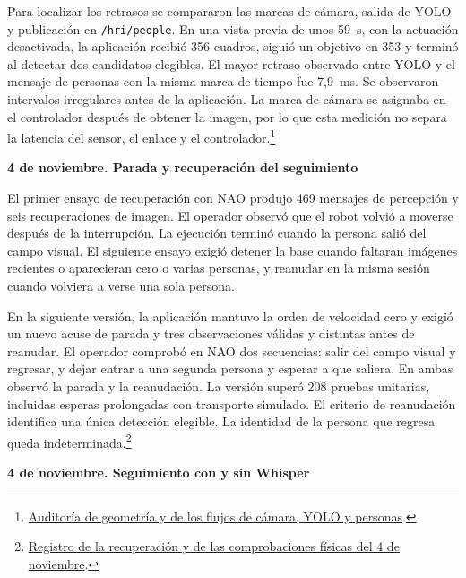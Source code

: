 \documentclass[11pt,letterpaper]{article}
\newcommand{\code}[1]{\nolinkurl{#1}}
\begin{document}
Para localizar los retrasos se compararon las marcas de cámara, salida de YOLO y publicación en \code{/hri/people}. En una vista previa de unos 59~s, con la actuación desactivada, la aplicación recibió 356 cuadros, siguió un objetivo en 353 y terminó al detectar dos candidatos elegibles. El mayor retraso observado entre YOLO y el mensaje de personas con la misma marca de tiempo fue 7,9~ms. Se observaron intervalos irregulares antes de la aplicación. La marca de cámara se asignaba en el controlador después de obtener la imagen, por lo que esta medición no separa la latencia del sensor, el enlace y el controlador.\footnote{\href{https://github.com/jumafe1/portable-hri-reference-system/blob/910c05f/results/follow_person_audit_20261104.json}{Auditoría de geometría y de los flujos de cámara, YOLO y personas}.}

\par\medskip\noindent\textbf{4 de noviembre. Parada y recuperación del seguimiento}\par

El primer ensayo de recuperación con NAO produjo 469 mensajes de percepción y seis recuperaciones de imagen. El operador observó que el robot volvió a moverse después de la interrupción. La ejecución terminó cuando la persona salió del campo visual. El siguiente ensayo exigió detener la base cuando faltaran imágenes recientes o aparecieran cero o varias personas, y reanudar en la misma sesión cuando volviera a verse una sola persona.

En la siguiente versión, la aplicación mantuvo la orden de velocidad cero y exigió un nuevo acuse de parada y tres observaciones válidas y distintas antes de reanudar. El operador comprobó en NAO dos secuencias: salir del campo visual y regresar, y dejar entrar a una segunda persona y esperar a que saliera. En ambas observó la parada y la reanudación. La versión superó 208 pruebas unitarias, incluidas esperas prolongadas con transporte simulado. El criterio de reanudación identifica una única detección elegible. La identidad de la persona que regresa queda indeterminada.\footnote{\href{https://github.com/jumafe1/portable-hri-reference-system/blob/b9e242f/results/follow_person_wait_20261104.json}{Registro de la recuperación y de las comprobaciones físicas del 4 de noviembre}.}

\par\medskip\noindent\textbf{4 de noviembre. Seguimiento con y sin Whisper}\par
\end{document}
